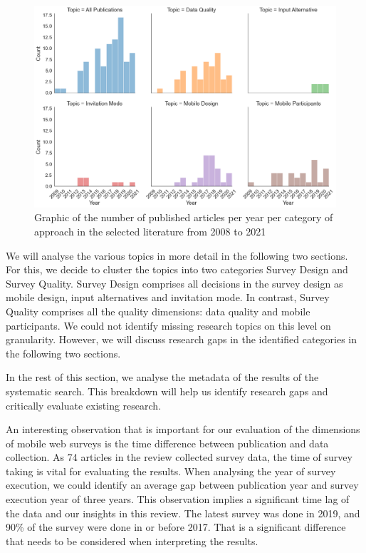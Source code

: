 \begin{figure}
    \centering
    \includegraphics[width=\textwidth]{reports/figures/publications_per_year_per_categories.png}
     \caption{Graphic of the number of published articles per year per category of approach in the selected literature from 2008 to 2021}
    \label{fig: publications_per_year_per_categories}
\end{figure}

We will analyse the various topics in more detail in the following two sections. For this, we decide to cluster the topics into two categories Survey Design and Survey Quality. Survey Design comprises all decisions in the survey design as mobile design, input alternatives and invitation mode. In contrast, Survey Quality comprises all the quality dimensions: data quality and mobile participants. We could not identify missing research topics on this level on granularity. However, we will discuss research gaps in the identified categories in the following two sections. 

In the rest of this section, we analyse the metadata of the results of the systematic search. This breakdown will help us identify research gaps and critically evaluate existing research.

An interesting observation that is important for our evaluation of the dimensions of mobile web surveys is the time difference between publication and data collection. As 74 articles in the review collected survey data, the time of survey taking is vital for evaluating the results. When analysing the year of survey execution, we could identify an average gap between publication year and survey execution year of three years. This observation implies a significant time lag of the data and our insights in this review. The latest survey was done in 2019, and 90\% of the survey were done in or before 2017. That is a significant difference that needs to be considered when interpreting the results.  

